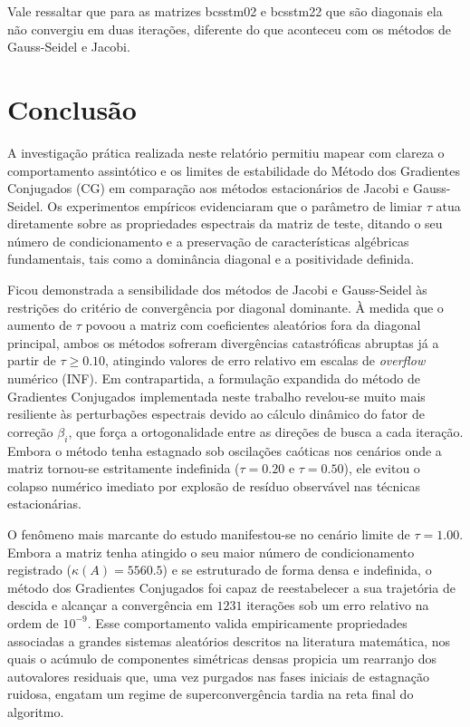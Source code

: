 \documentclass[12pt,a4paper]{article}
\begin{document}
Vale ressaltar que para as matrizes bcsstm02 e bcsstm22 que são diagonais ela não convergiu em duas iterações, diferente do que aconteceu com os métodos de Gauss-Seidel e Jacobi.

\section{Conclusão}
A investigação prática realizada neste relatório permitiu mapear com clareza o comportamento assintótico e os limites de estabilidade do Método dos Gradientes Conjugados (CG) em comparação aos métodos estacionários de Jacobi e Gauss-Seidel. Os experimentos empíricos evidenciaram que o parâmetro de limiar $\tau$ atua diretamente sobre as propriedades espectrais da matriz de teste, ditando o seu número de condicionamento e a preservação de características algébricas fundamentais, tais como a dominância diagonal e a positividade definida. 

Ficou demonstrada a sensibilidade dos métodos de Jacobi e Gauss-Seidel às restrições do critério de convergência por diagonal dominante. À medida que o aumento de $\tau$ povoou a matriz com coeficientes aleatórios fora da diagonal principal, ambos os métodos sofreram divergências catastróficas abruptas já a partir de $\tau \ge 0.10$, atingindo valores de erro relativo em escalas de \textit{overflow} numérico (INF). Em contrapartida, a formulação expandida do método de Gradientes Conjugados implementada neste trabalho revelou-se muito mais resiliente às perturbações espectrais devido ao cálculo dinâmico do fator de correção $\beta_i$, que força a ortogonalidade entre as direções de busca a cada iteração. Embora o método tenha estagnado sob oscilações caóticas nos cenários onde a matriz tornou-se estritamente indefinida ($\tau = 0.20$ e $\tau = 0.50$), ele evitou o colapso numérico imediato por explosão de resíduo observável nas técnicas estacionárias.

O fenômeno mais marcante do estudo manifestou-se no cenário limite de $\tau = 1.00$. Embora a matriz tenha atingido o seu maior número de condicionamento registrado ($\kappa(A) = 5560.5$) e se estruturado de forma densa e indefinida, o método dos Gradientes Conjugados foi capaz de reestabelecer a sua trajetória de descida e alcançar a convergência em $1231$ iterações sob um erro relativo na ordem de $10^{-9}$. Esse comportamento valida empiricamente propriedades associadas a grandes sistemas aleatórios descritos na literatura matemática, nos quais o acúmulo de componentes simétricas densas propicia um rearranjo dos autovalores residuais que, uma vez purgados nas fases iniciais de estagnação ruidosa, engatam um regime de superconvergência tardia na reta final do algoritmo.
\end{document}

